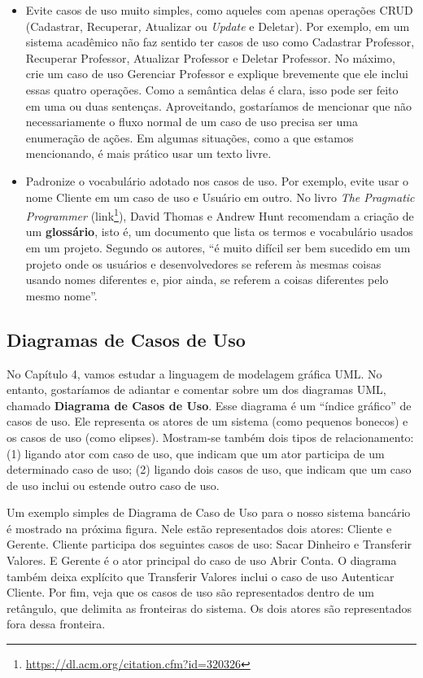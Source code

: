 \documentclass[
  11pt,
  twoside]{book}
\DeclareRobustCommand{\href}[2]{#2\footnote{\url{#1}}}
\begin{document}
\begin{itemize}
\item
  Evite casos de uso muito simples, como aqueles com apenas operações
  CRUD (Cadastrar, Recuperar\emph{,} Atualizar ou \emph{Update} e
  Deletar). Por exemplo, em um sistema acadêmico não faz sentido ter
  casos de uso como Cadastrar Professor, Recuperar Professor, Atualizar
  Professor e Deletar Professor. No máximo, crie um caso de uso
  Gerenciar Professor e explique brevemente que ele inclui essas quatro
  operações. Como a semântica delas é clara, isso pode ser feito em uma
  ou duas sentenças. Aproveitando, gostaríamos de mencionar que não
  necessariamente o fluxo normal de um caso de uso precisa ser uma
  enumeração de ações. Em algumas situações, como a que estamos
  mencionando, é mais prático usar um texto livre.
\item
  Padronize o vocabulário adotado nos casos de uso. Por exemplo, evite
  usar o nome Cliente em um caso de uso e Usuário em outro. No livro
  \emph{The Pragmatic Programmer}
  (\href{https://dl.acm.org/citation.cfm?id=320326}{link}), David Thomas
  e Andrew Hunt recomendam a criação de um \textbf{glossário}, isto é,
  um documento que lista os termos e vocabulário usados em um projeto.
  Segundo os autores, ``é muito difícil ser bem sucedido em um projeto
  onde os usuários e desenvolvedores se referem às mesmas coisas usando
  nomes diferentes e, pior ainda, se referem a coisas diferentes pelo
  mesmo nome''.
\end{itemize}

\hypertarget{diagramas-de-casos-de-uso}{%
\subsection{Diagramas de Casos de Uso}\label{diagramas-de-casos-de-uso}}

 

No Capítulo 4, vamos estudar a linguagem de modelagem gráfica UML. No
entanto, gostaríamos de adiantar e comentar sobre um dos diagramas UML,
chamado \textbf{Diagrama de Casos de Uso}. Esse diagrama é um ``índice
gráfico'' de casos de uso. Ele representa os atores de um sistema (como
pequenos bonecos) e os casos de uso (como elipses). Mostram-se também
dois tipos de relacionamento: (1) ligando ator com caso de uso, que
indicam que um ator participa de um determinado caso de uso; (2) ligando
dois casos de uso, que indicam que um caso de uso inclui ou estende
outro caso de uso.

Um exemplo simples de Diagrama de Caso de Uso para o nosso sistema
bancário é mostrado na próxima figura. Nele estão representados dois
atores: Cliente e Gerente. Cliente participa dos seguintes casos de uso:
Sacar Dinheiro e Transferir Valores. E Gerente é o ator principal do
caso de uso Abrir Conta. O diagrama também deixa explícito que
Transferir Valores inclui o caso de uso Autenticar Cliente. Por fim,
veja que os casos de uso são representados dentro de um retângulo, que
delimita as fronteiras do sistema. Os dois atores são representados fora
dessa fronteira.
\end{document}

